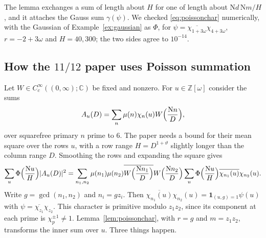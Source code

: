 \documentclass[11pt]{article}
\numberwithin{equation}{section}
\newcommand{\N}{\mathrm N}
\newcommand{\OO}{\mathbb Z[\omega]}
\theoremstyle{definition}
\theoremstyle{remark}
\begin{document}
The lemma exchanges a sum of length about $H$ for one of length about $\N d\,\N m/H$, and it attaches the
Gauss sum $\gamma(\psi)$. We checked \eqref{eq:poissonchar} numerically, with the Gaussian of
Example~\ref{ex:gaussian} as $\Phi$, for $\psi=\overline{\chi_{1+3\omega}}\chi_{4+3\omega}$, $r=-2+3\omega$ and
$H=40,300$; the two sides agree to $10^{-14}$.

\subsection{How the \texorpdfstring{$11/12$}{11/12} paper uses Poisson summation}\label{sec:poissonuse}
Let $W\in C_c^\infty((0,\infty);\mathbb C)$ be fixed and nonzero. For $u\in\OO$ consider the sums
\begin{equation}\label{eq:Au}
 A_u(D)=\sum_n\mu(n)\chi_n(u)W\Bigl(\frac{\N n}D\Bigr),
\end{equation}
over squarefree primary $n$ prime to $6$. The paper needs a bound for their mean square over the rows $u$, with a
row range $H=D^{1+\vartheta}$ slightly longer than the column range $D$. Smoothing the rows and expanding the square
gives
\begin{equation}\label{eq:expandsquare}
 \sum_u\Phi\Bigl(\frac{\N u}H\Bigr)|A_u(D)|^2=\sum_{n_1,n_2}\mu(n_1)\mu(n_2)\overline{W\Bigl(\frac{\N n_1}D\Bigr)}W\Bigl(\frac{\N n_2}D\Bigr)
 \sum_u\Phi\Bigl(\frac{\N u}H\Bigr)\overline{\chi_{n_1}(u)}\chi_{n_2}(u).
\end{equation}
Write $g=\gcd(n_1,n_2)$ and $n_i=gz_i$. Then $\overline{\chi_{n_1}(u)}\chi_{n_2}(u)=\mathbf 1_{(u,g)=1}\psi(u)$ with
$\psi=\overline{\chi_{z_1}}\chi_{z_2}$. This character is primitive modulo $z_1z_2$, since its component at each
prime is $\chi_p^{\pm1}\ne1$. Lemma~\ref{lem:poissonchar}, with $r=g$ and $m=z_1z_2$, transforms the inner sum over $u$.
Three things happen.
\end{document}
